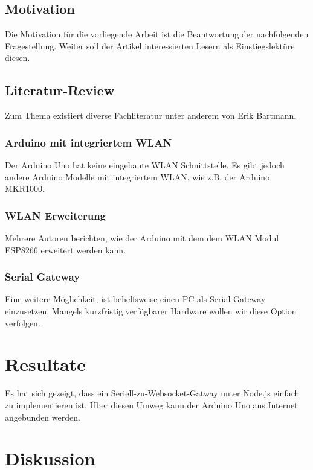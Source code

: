 \subsection{Motivation}
Die Motivation für die vorliegende Arbeit ist die Beantwortung der nachfolgenden Fragestellung.
Weiter soll der Artikel interessierten Lesern als Einstiegslektüre diesen.

\subsection{Literatur-Review}
Zum Thema existiert diverse Fachliteratur unter anderem von Erik Bartmann\cite{bartmannArduino}\cite{bartmannESP8266}\cite{bartmannESP32}.

\subsubsection{Arduino mit integriertem WLAN}
Der Arduino Uno hat keine eingebaute WLAN Schnittstelle. Es gibt jedoch andere Arduino Modelle mit integriertem WLAN, wie z.B. der Arduino MKR1000.

\subsubsection{WLAN Erweiterung}
Mehrere Autoren berichten\cite{temperatureDashboard}\cite{websocketcommunication}, wie der Arduino mit dem dem WLAN Modul ESP8266 erweitert werden kann. 

\subsubsection{Serial Gateway}
Eine weitere Möglichkeit, ist behelfsweise einen PC als Serial Gateway einzusetzen.
Mangels kurzfristig verfügbarer Hardware wollen wir diese Option verfolgen.



\section{Resultate}
Es hat sich gezeigt, dass ein Seriell-zu-Websocket-Gatway unter Node.js einfach zu implementieren ist. Über diesen Umweg kann der Arduino Uno ans Internet angebunden werden.

\section{Diskussion}

